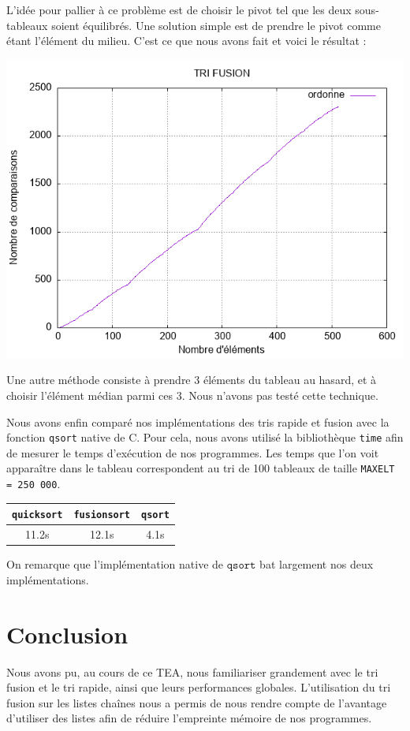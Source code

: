 \documentclass[11pt]{article}
\begin{document}
L'idée pour pallier à ce problème est de choisir le pivot tel que les deux sous-tableaux soient équilibrés. Une solution simple est de prendre le pivot comme étant l'élément du milieu. C'est ce que nous avons fait et voici le résultat :

\begin{center}
\includegraphics[scale=0.6]{images/tri_rapide_fixed.png}
\end{center}

Une autre méthode consiste à prendre 3 éléments du tableau au hasard, et à choisir l'élément médian parmi ces 3. Nous n'avons pas testé cette technique.


Nous avons enfin comparé nos implémentations des tris rapide et fusion avec la fonction \texttt{qsort} native de \textsc{C}. Pour cela, nous avons utilisé la bibliothèque \texttt{time} afin de mesurer le temps d'exécution de nos programmes. Les temps que l'on voit apparaître dans le tableau correspondent au tri de 100 tableaux de taille \texttt{MAX\textunderscore ELT = 250 000}.

\begin{center}
\begin{tabular}{||c c c||} 
 \hline
 \texttt{quicksort} & \texttt{fusionsort} & \texttt{qsort} \\ [0.5ex] 
 \hline\hline
11.2s & 12.1s & 4.1s \\ 
\hline
\end{tabular}
\end{center}

On remarque que l'implémentation native de $\texttt{qsort}$ bat largement nos deux implémentations.

\section{Conclusion}

\quad \quad Nous avons pu, au cours de ce TEA, nous familiariser grandement avec le tri fusion et le tri rapide, ainsi que leurs performances globales. L'utilisation du tri fusion sur les listes chaînes nous a permis de nous rendre compte de l'avantage d'utiliser des listes afin de réduire l'empreinte mémoire de nos programmes.
\end{document}
